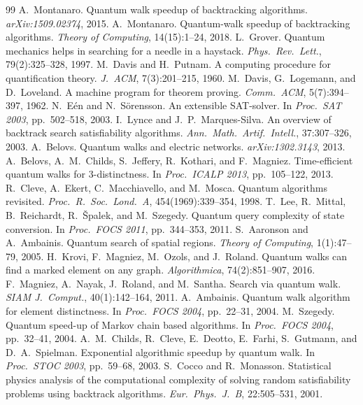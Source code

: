 \documentclass[11pt,a4paper]{article}
\begin{document}
\begin{thebibliography}{99}
 A.~Montanaro. Quantum walk speedup of backtracking algorithms. \emph{arXiv:1509.02374}, 2015.
 A.~Montanaro. Quantum-walk speedup of backtracking algorithms. \emph{Theory of Computing}, 14(15):1--24, 2018.
 L.~Grover. Quantum mechanics helps in searching for a needle in a haystack. \emph{Phys.\ Rev.\ Lett.}, 79(2):325--328, 1997.
 M.~Davis and H.~Putnam. A computing procedure for quantification theory. \emph{J.\ ACM}, 7(3):201--215, 1960.
 M.~Davis, G.~Logemann, and D.~Loveland. A machine program for theorem proving. \emph{Comm.\ ACM}, 5(7):394--397, 1962.
 N.~E\'{e}n and N.~S\"{o}rensson. An extensible SAT-solver. In \emph{Proc.\ SAT 2003}, pp.\ 502--518, 2003.
 I.~Lynce and J.~P.~Marques-Silva. An overview of backtrack search satisfiability algorithms. \emph{Ann.\ Math.\ Artif.\ Intell.}, 37:307--326, 2003.
 A.~Belovs. Quantum walks and electric networks. \emph{arXiv:1302.3143}, 2013.
 A.~Belovs, A.~M.~Childs, S.~Jeffery, R.~Kothari, and F.~Magniez. Time-efficient quantum walks for 3-distinctness. In \emph{Proc.\ ICALP 2013}, pp.\ 105--122, 2013.
 R.~Cleve, A.~Ekert, C.~Macchiavello, and M.~Mosca. Quantum algorithms revisited. \emph{Proc.\ R.\ Soc.\ Lond.\ A}, 454(1969):339--354, 1998.
 T.~Lee, R.~Mittal, B.~Reichardt, R.~\v{S}palek, and M.~Szegedy. Quantum query complexity of state conversion. In \emph{Proc.\ FOCS 2011}, pp.\ 344--353, 2011.
 S.~Aaronson and A.~Ambainis. Quantum search of spatial regions. \emph{Theory of Computing}, 1(1):47--79, 2005.
 H.~Krovi, F.~Magniez, M.~Ozols, and J.~Roland. Quantum walks can find a marked element on any graph. \emph{Algorithmica}, 74(2):851--907, 2016.
 F.~Magniez, A.~Nayak, J.~Roland, and M.~Santha. Search via quantum walk. \emph{SIAM J.\ Comput.}, 40(1):142--164, 2011.
 A.~Ambainis. Quantum walk algorithm for element distinctness. In \emph{Proc.\ FOCS 2004}, pp.\ 22--31, 2004.
 M.~Szegedy. Quantum speed-up of Markov chain based algorithms. In \emph{Proc.\ FOCS 2004}, pp.\ 32--41, 2004.
 A.~M.~Childs, R.~Cleve, E.~Deotto, E.~Farhi, S.~Gutmann, and D.~A.~Spielman. Exponential algorithmic speedup by quantum walk. In \emph{Proc.\ STOC 2003}, pp.\ 59--68, 2003.
 S.~Cocco and R.~Monasson. Statistical physics analysis of the computational complexity of solving random satisfiability problems using backtrack algorithms. \emph{Eur.\ Phys.\ J.\ B}, 22:505--531, 2001.

\end{thebibliography}
\end{document}
